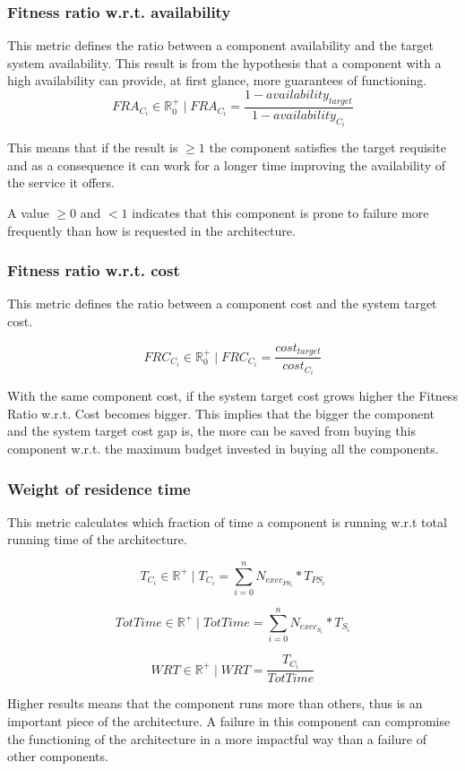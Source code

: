 \subsubsection{Fitness ratio w.r.t. availability}
This metric defines the ratio between a component availability and the target system availability. This result is from the hypothesis that a component with a high availability can provide, at first glance, more guarantees of functioning. 
\[ FRA_{C_i} \in \mathbb{R}^+_0 \; | \; FRA_{C_i} = \frac{1 - availability_{target}}{1- availability_{C_i}} \]

This means that if the result is $\ge 1$ the component satisfies the target requisite and as a consequence it can work for a longer time improving the availability of the service it offers. 

A value $\ge 0 $ and $<1$ indicates that this component is prone to failure more frequently than how is requested in the architecture.

\subsubsection{Fitness ratio w.r.t. cost}
This metric defines the ratio between a component cost and the system target cost. 

\[ FRC_{C_i} \in \mathbb{R}^+_0 \; | \; FRC_{C_i} = \frac{cost_{target}}{cost_{C_i}}\]

With the same component cost, if the system target cost grows higher the Fitness Ratio w.r.t. Cost becomes bigger. This implies that the bigger the component and the system target cost gap is, the more can be saved from buying this component w.r.t. the maximum budget invested in buying all the components.

\subsubsection{Weight of residence time}
This metric calculates which fraction of time a component is running w.r.t total running time of the architecture.

\[ T_{C_i} \in \mathbb{R}^+ \; | \; T_{C_i} = \sum_{i=0}^{n} N_{exec_{PS_i}} * T_{PS_i} \]

\[ TotTime \in \mathbb{R^+} \; | \; TotTime = \sum_{i=0}^{n}N_{exec_{S_i}} * T_{S_i} \]

\[ WRT \in \mathbb{R}^+ \; | \; WRT = \frac{T_{C_i}}{TotTime} \]

Higher results means that the component runs more than others, thus is an important piece of the architecture. A failure in this component can compromise the functioning of the architecture in a more impactful way than a failure of other components.

